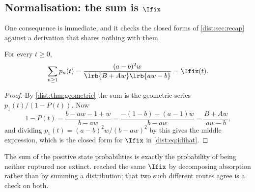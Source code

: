 \subsection{Normalisation: the sum is \texorpdfstring{$\Ifix$}{Ifix}}
\label{dist:sec:sum-ihat}

One consequence is immediate, and it checks the closed forms of
\cref{dist:sec:recap} against a derivation that shares nothing with them.

\begin{corollary}
\label{dist:cor:sum}
For every $t\ge0$,
\begin{equation}
\sum_{n\ge1}p_n(t)
=\frac{(a-b)^2 w}{\lrb{B+Aw}\lrb{aw-b}}
=\Ifix(t).
\label{dist:eq:pnsum}
\end{equation}
\end{corollary}

\begin{proof}
By \cref{dist:thm:geometric} the sum is the geometric series
$p_1(t)/(1-P(t))$. Now
\[
1-P(t)=\frac{b-aw-1+w}{b-aw}
=\frac{-(1-b)-(a-1)w}{b-aw}
=\frac{B+Aw}{aw-b},
\]
and dividing $p_1(t)=(a-b)^2w/(b-aw)^2$ by this gives the middle expression,
which is the closed form for $\Ifix$ in \cref{dist:eq:idihat}.
\end{proof}

The sum of the positive state probabilities is exactly the probability of
being neither ruptured nor extinct. \ChCorecap{} reached the same $\Ifix$ by
decomposing absorption rather than by summing a distribution; that two such
different routes agree is a check on both.
